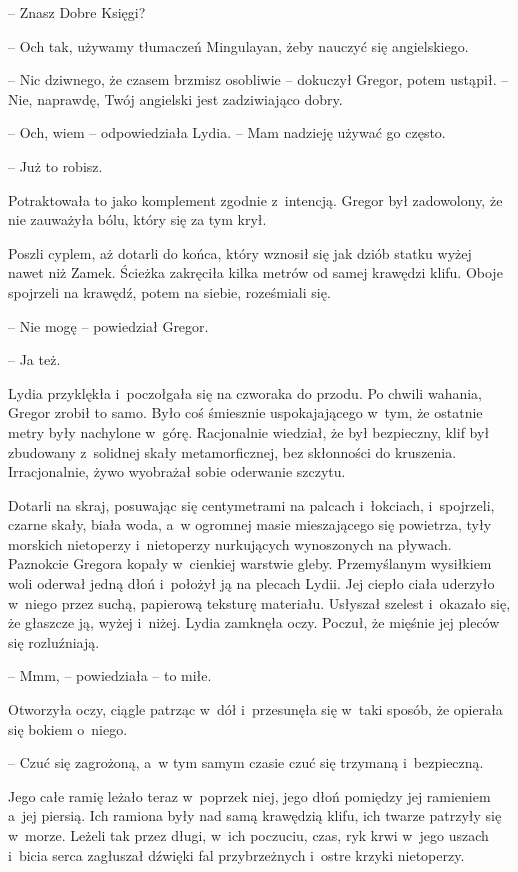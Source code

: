 \documentclass[oneside,polish,12pt,sfheadings]{mwbk}
\begin{document}
-- Znasz Dobre
Księgi?

-- Och tak, używamy tłumaczeń Mingulayan, żeby nauczyć się angielskiego.

-- Nic dziwnego, że czasem brzmisz osobliwie -- dokuczył Gregor, potem
ustąpił. -- Nie, naprawdę, Twój angielski jest zadziwiająco dobry.

-- Och, wiem -- odpowiedziała Lydia. -- Mam nadzieję używać go często.

-- Już to robisz.

Potraktowała to jako komplement zgodnie z~intencją. Gregor był
zadowolony, że nie zauważyła bólu, który się za tym krył.

Poszli cyplem, aż dotarli do końca, który wznosił się jak dziób statku
wyżej nawet niż Zamek. Ścieżka zakręciła kilka metrów od samej krawędzi
klifu. Oboje spojrzeli na krawędź, potem na siebie, roześmiali się.

-- Nie mogę -- powiedział Gregor.

-- Ja też.

Lydia przyklękła i~poczołgała się na czworaka do przodu. Po chwili
wahania, Gregor zrobił to samo. Było coś śmiesznie uspokajającego w~tym,
że ostatnie metry były nachylone w~górę. Racjonalnie wiedział, że był
bezpieczny, klif był zbudowany z~solidnej skały metamorficznej, bez
skłonności do kruszenia. Irracjonalnie, żywo wyobrażał sobie oderwanie
szczytu.

Dotarli na skraj, posuwając się centymetrami na palcach i~łokciach, i~spojrzeli, czarne skały, biała woda, a~w ogromnej masie mieszającego się
powietrza, tyły morskich nietoperzy i~nietoperzy nurkujących wynoszonych
na pływach. Paznokcie Gregora kopały w~cienkiej warstwie gleby.
Przemyślanym wysiłkiem woli oderwał jedną dłoń i~położył ją na plecach
Lydii. Jej ciepło ciała uderzyło w~niego przez suchą, papierową teksturę
materiału. Usłyszał szelest i~okazało się, że głaszcze ją, wyżej i~niżej. Lydia zamknęła oczy. Poczuł, że mięśnie jej pleców się
rozluźniają.

-- Mmm, -- powiedziała -- to miłe.

Otworzyła oczy, ciągle patrząc w~dół i~przesunęła się w~taki sposób, że
opierała się bokiem o~niego. 

-- Czuć się zagrożoną, a~w tym samym czasie
czuć się trzymaną i~bezpieczną.

Jego całe ramię leżało teraz w~poprzek niej, jego dłoń pomiędzy jej
ramieniem a~jej piersią. Ich ramiona były nad samą krawędzią klifu, ich
twarze patrzyły się w~morze. Leżeli tak przez długi, w~ich poczuciu,
czas, ryk krwi w~jego uszach i~bicia serca zagłuszał dźwięki fal
przybrzeżnych i~ostre krzyki nietoperzy.
\end{document}
